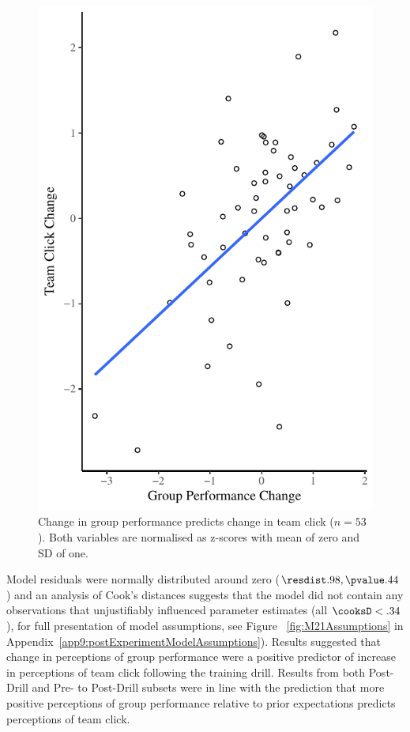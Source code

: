  \begin{figure}
     \centering
     \includegraphics[width=0.5\linewidth,keepaspectratio] {images/groupPerfClickChangeCondition}
     \caption{Change in group performance predicts change in team click ($n = 53$).  Both variables are normalised as z-scores with mean of zero and SD of one.}
     \label{fig:groupPerfClickChangeCondition}
 \end{figure}

Model residuals were normally distributed around zero ($\resdist .98, \pvalue .44$) and an analysis of Cook's distances suggests that the model did not contain any observations that unjustifiably influenced parameter estimates (all $\cooksD < .34$), for full presentation of model assumptions, see Figure ~\ref{fig:M21Assumptions} in Appendix~\ref{app9:postExperimentModelAssumptions}). Results suggested that change in perceptions of group performance were a positive predictor of increase in perceptions of team click following the training drill.  Results from both Post-Drill and Pre- to Post-Drill subsets were in line with the prediction that more positive perceptions of group performance relative to prior expectations predicts perceptions of team click.




